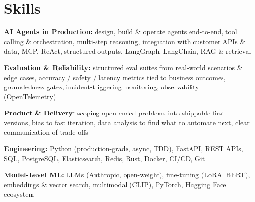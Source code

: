 \documentclass[10pt,a4paper]{article}
\begin{document}
\section{Skills}
\begin{tight}
  \item[\textcolor{accent}{\small$\bullet$}] \textbf{AI Agents in Production:} design, build \& operate agents end-to-end, tool calling \& orchestration, multi-step reasoning, integration with customer APIs \& data, MCP, ReAct, structured outputs, LangGraph, LangChain, RAG \& retrieval
  \item[\textcolor{accent}{\small$\bullet$}] \textbf{Evaluation \& Reliability:} structured eval suites from real-world scenarios \& edge cases, accuracy / safety / latency metrics tied to business outcomes, groundedness gates, incident-triggering monitoring, observability (OpenTelemetry)
  \item[\textcolor{accent}{\small$\bullet$}] \textbf{Product \& Delivery:} scoping open-ended problems into shippable first versions, bias to fast iteration, data analysis to find what to automate next, clear communication of trade-offs
  \item[\textcolor{accent}{\small$\bullet$}] \textbf{Engineering:} Python (production-grade, async, TDD), FastAPI, REST APIs, SQL, PostgreSQL, Elasticsearch, Redis, Rust, Docker, CI/CD, Git
  \item[\textcolor{accent}{\small$\bullet$}] \textbf{Model-Level ML:} LLMs (Anthropic, open-weight), fine-tuning (LoRA, BERT), embeddings \& vector search, multimodal (CLIP), PyTorch, Hugging Face ecosystem
\end{tight}

\end{document}
